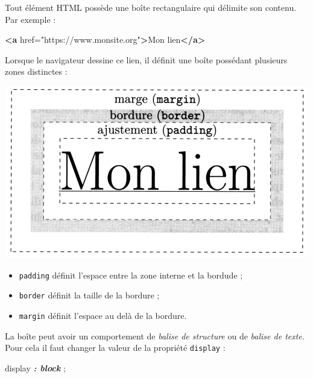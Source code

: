 \documentclass[a4paper,17pt]{extarticle}
\let\origfigure\figure
\let\endorigfigure\endfigure
\renewenvironment{figure}[1][2] {
    \expandafter\origfigure\expandafter[H]
} {
    \endorigfigure
}
\providecommand{\tightlist}{%
      \setlength{\itemsep}{0pt}\setlength{\parskip}{0pt}}
\newenvironment{Shaded}{}{}
\newcommand{\KeywordTok}[1]{\textcolor[rgb]{0.00,0.44,0.13}{\textbf{{#1}}}}
\newcommand{\StringTok}[1]{\textcolor[rgb]{0.25,0.44,0.63}{{#1}}}
\newcommand{\OtherTok}[1]{\textcolor[rgb]{0.00,0.44,0.13}{{#1}}}
\newcommand{\NormalTok}[1]{{#1}}
\newcommand{\InformationTok}[1]{\textcolor[rgb]{0.38,0.63,0.69}{\textbf{\textit{{#1}}}}}
\begin{document}
    Tout élément HTML possède une boîte rectangulaire qui délimite son
contenu. Par exemple :

\begin{Shaded}
\begin{Highlighting}[]
\KeywordTok{\textless{}a}\OtherTok{ href=}\StringTok{"https://www.monsite.org"}\KeywordTok{\textgreater{}}\NormalTok{Mon lien}\KeywordTok{\textless{}/a\textgreater{}}
\end{Highlighting}
\end{Shaded}

Lorsque le navigateur dessine ce lien, il définit une boîte possédant
plusieurs zones distinctes :

\begin{figure}
\centering
\includegraphics{res/boite_css.png}
\caption{mon lien}
\end{figure}

\begin{itemize}
\tightlist
\item
  \texttt{padding} définit l'espace entre la zone interne et la bordude
  ;
\item
  \texttt{border} définit la taille de la bordure ;
\item
  \texttt{margin} définit l'espace au delà de la bordure.
\end{itemize}

    La boîte peut avoir un comportement de \emph{balise de structure} ou de
\emph{balise de texte}. Pour cela il faut changer la valeur de la
propriété \texttt{display} :

\begin{Shaded}
\begin{Highlighting}[]
\NormalTok{display }\InformationTok{: block}\NormalTok{ ;}
\end{Highlighting}
\end{Shaded}
\end{document}
